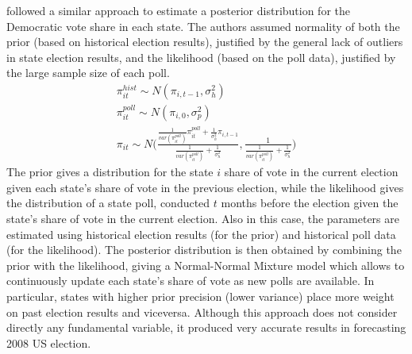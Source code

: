 \documentclass[
  12pt]{article}
\begin{document}
\citet{loc:gel:2010} followed a similar approach to estimate a posterior
distribution for the Democratic vote share in each state. The authors
assumed normality of both the prior (based on historical election
results), justified by the general lack of outliers in state election
results, and the likelihood (based on the poll data), justified by the
large sample size of each poll. \[
\begin{aligned}
\pi_{it}^{hist} \sim N(\pi_{i,t-1}, \sigma^2_{h}) \;\;\;\;\;\;\;\;\;\;\;\;\;\;\;\;\;\;\;\;\;\; \\
\pi_{it}^{poll} \sim N(\pi_{i,0}, \sigma^2_{p}) \;\;\;\;\;\;\;\;\;\;\;\;\;\;\;\;\;\;\;\;\;\;\;\; \\
\pi_{it} \sim N\biggl(\frac{\frac{1}{var(\pi^{poll}_{it})}\pi^{poll}_{it} + \frac{1}{\sigma^2_{h}}\pi_{i,t-1}}{\frac{1}{var(\pi^{poll}_{it})} + \frac{1}{\sigma^2_{h}}}, \frac{1}{\frac{1}{var(\pi^{poll}_{it})} + \frac{1}{\sigma^2_{h}}} \biggr)
\end{aligned}
\] The prior gives a distribution for the state \(i\) share of vote in
the current election given each state's share of vote in the previous
election, while the likelihood gives the distribution of a state poll,
conducted \(t\) months before the election given the state's share of
vote in the current election. Also in this case, the parameters are
estimated using historical election results (for the prior) and
historical poll data (for the likelihood). The posterior distribution is
then obtained by combining the prior with the likelihood, giving a
Normal-Normal Mixture model which allows to continuously update each
state's share of vote as new polls are available. In particular, states
with higher prior precision (lower variance) place more weight on past
election results and viceversa. Although this approach does not consider
directly any fundamental variable, it produced very accurate results in
forecasting 2008 US election.
\end{document}
